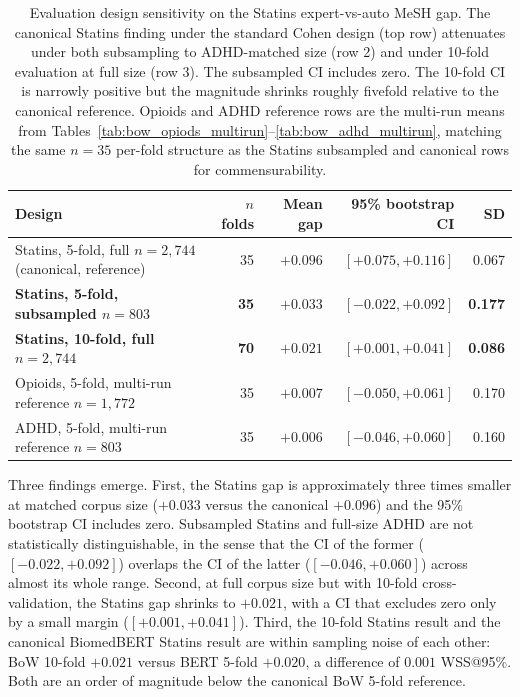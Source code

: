 \documentclass{article}
\begin{document}
\begin{table}[t]
\centering
\small
\begin{tabular}{lrrrr}
\toprule
Design & $n$ folds & Mean gap & 95\% bootstrap CI & SD \\
\midrule
Statins, 5-fold, full $n = 2{,}744$ (canonical, reference)   & 35  & $+0.096$ & $[+0.075, +0.116]$  & 0.067 \\
\textbf{Statins, 5-fold, subsampled $n = 803$}                & \textbf{35}  & \textbf{$+0.033$} & \textbf{$[-0.022, +0.092]$} & \textbf{0.177} \\
\textbf{Statins, 10-fold, full $n = 2{,}744$}                  & \textbf{70}  & \textbf{$+0.021$} & \textbf{$[+0.001, +0.041]$} & \textbf{0.086} \\
Opioids, 5-fold, multi-run reference $n = 1{,}772$              & 35  & $+0.007$ & $[-0.050, +0.061]$  & 0.170 \\
ADHD, 5-fold, multi-run reference $n = 803$                     & 35  & $+0.006$ & $[-0.046, +0.060]$  & 0.160 \\
\bottomrule
\end{tabular}
\caption{Evaluation design sensitivity on the Statins expert-vs-auto MeSH gap. The canonical Statins finding under the standard Cohen design (top row) attenuates under both subsampling to ADHD-matched size (row 2) and under 10-fold evaluation at full size (row 3). The subsampled CI includes zero. The 10-fold CI is narrowly positive but the magnitude shrinks roughly fivefold relative to the canonical reference. Opioids and ADHD reference rows are the multi-run means from Tables~\ref{tab:bow_opiods_multirun}--\ref{tab:bow_adhd_multirun}, matching the same $n = 35$ per-fold structure as the Statins subsampled and canonical rows for commensurability.}
\label{tab:design_sensitivity}
\end{table}

Three findings emerge. First, the Statins gap is approximately three times smaller at matched corpus size ($+0.033$ versus the canonical $+0.096$) and the 95\% bootstrap CI includes zero. Subsampled Statins and full-size ADHD are not statistically distinguishable, in the sense that the CI of the former ($[-0.022, +0.092]$) overlaps the CI of the latter ($[-0.046, +0.060]$) across almost its whole range. Second, at full corpus size but with 10-fold cross-validation, the Statins gap shrinks to $+0.021$, with a CI that excludes zero only by a small margin ($[+0.001, +0.041]$). Third, the 10-fold Statins result and the canonical BiomedBERT Statins result are within sampling noise of each other: BoW 10-fold $+0.021$ versus BERT 5-fold $+0.020$, a difference of $0.001$ WSS@95\%. Both are an order of magnitude below the canonical BoW 5-fold reference.
\end{document}
